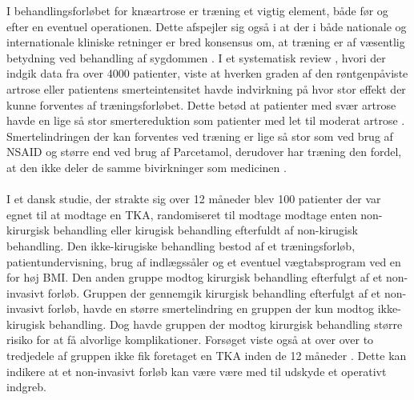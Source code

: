 I behandlingsforløbet for knæartrose er træning et vigtig element, både før og efter en eventuel operationen. Dette afspejler sig også i at der i både nationale og internationale kliniske retninger er bred konsensus om, at træning er af væsentlig betydning ved behandling af  sygdommen  \citep{brostrom2012}.  I et systematisk review , hvori der indgik data fra over 4000 patienter, viste at hverken graden af den røntgenpåviste artrose eller patientens smerteintensitet havde indvirkning på hvor stor effekt der kunne forventes af træningsforløbet. Dette betød at patienter med svær artrose havde en lige så stor smertereduktion som patienter med let til moderat artrose \citep{Syssorenskou}. 
Smertelindringen der kan forventes ved træning er lige så stor som ved brug af NSAID og større end ved brug af Parcetamol, derudover har træning den fordel, at den ikke deler de samme bivirkninger som  medicinen \citep{sorenskou}.\\\\
I et dansk studie, der strakte sig over 12 måneder blev 100 patienter  der var egnet til at modtage en TKA, randomiseret til modtage modtage enten non-kirurgisk behandling eller kirugisk behandling efterfuldt af non-kirugisk behandling. Den ikke-kirugiske behandling  bestod af et træningsforløb, patientundervisning, brug af indlægssåler og et eventuel vægtabsprogram ved en for høj BMI. Den anden gruppe modtog kirurgisk behandling efterfulgt af et non-invasivt forløb. Gruppen der gennemgik kirurgisk behandling efterfulgt af  et non-invasivt forløb, havde en større smertelindring en gruppen der kun modtog ikke-kirugisk behandling. Dog havde gruppen der modtog kirurgisk behandling større risiko for at få alvorlige komplikationer. Forsøget viste også at over over to tredjedele af gruppen ikke fik foretaget en TKA inden de 12 måneder \citep{newEngland}. Dette kan indikere at et non-invasivt forløb kan være være med til udskyde et operativt indgreb. 

%

